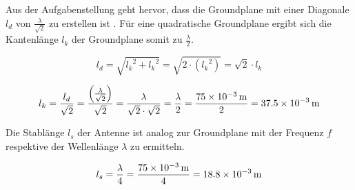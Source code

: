 Aus der Aufgabenstellung geht hervor, dass die Groundplane mit einer
Diagonale $l_d$ von $\frac{\lambda}{\sqrt{2}}$ zu erstellen ist
\cite[S.1, 2a]{lab1}. Für eine quadratische Groundplane ergibt sich
die Kantenlänge $l_k$ der Groundplane somit zu $\frac{\lambda}{2}$.

\begin{equation}
	l_d
	= \sqrt{{l_k}^2 + {l_k}^2}
	= \sqrt{2 \cdot ({l_k}^2)}
	= \sqrt{2} \cdot l_k
\end{equation}

\begin{equation}
	l_k
	= \frac{l_d}{\sqrt{2}}
	= \frac{\left(\frac{\lambda}{\sqrt{2}}\right)}{\sqrt{2}}
	= \frac{\lambda}{\sqrt{2} \cdot \sqrt{2}}
	= \frac{\lambda}{2}
	= \frac{\SI{75d-3}{\meter}}{2}
	= \SI{37.5d-3}{\meter}
\end{equation}

Die Stablänge $l_s$ der Antenne ist analog zur Groundplane mit der
Frequenz $f$ respektive der Wellenlänge $\lambda$ zu ermitteln.

\begin{equation}
	l_s
	= \frac{\lambda}{4}
	= \frac{\SI{75d-3}{\meter}}{4}
	= \SI{18.8d-3}{\meter}
\end{equation}


